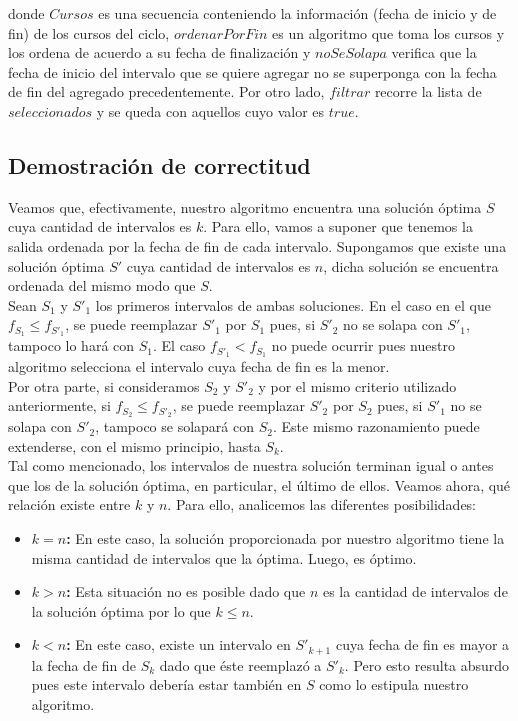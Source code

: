 donde $Cursos$ es una secuencia conteniendo la información (fecha de inicio y de fin) de los cursos del ciclo, $ordenarPorFin$ es un algoritmo que toma los cursos y los ordena de acuerdo a su fecha de finalización y $noSeSolapa$ verifica que la fecha de inicio del intervalo que se quiere agregar no se superponga con la fecha de fin del agregado precedentemente. Por otro lado, $filtrar$ recorre la lista de $seleccionados$ y se queda con aquellos cuyo valor es $true$.

\subsection{Demostración de correctitud}

Veamos que, efectivamente, nuestro algoritmo encuentra una solución óptima $S$ cuya cantidad de intervalos es $k$. Para ello, vamos a suponer que tenemos la salida ordenada por la fecha de fin de cada intervalo. Supongamos que existe una solución óptima $S'$ cuya cantidad de intervalos es $n$, dicha solución se encuentra ordenada del mismo modo que $S$.\\
\newline
Sean $S_{1}$ y $S'_{1}$ los primeros intervalos de ambas soluciones. En el caso en el que $f_{S_{1}} \leq f_{S'_{1}}$, se puede reemplazar $S'_{1}$ por $S_{1}$ pues, si $S'_{2}$ no se solapa con $S'_{1}$, tampoco lo hará con $S_{1}$. El caso $f_{S'_{1}} < f_{S_{1}}$ no puede ocurrir pues nuestro algoritmo selecciona el intervalo cuya fecha de fin es la menor.\\
\newline
Por otra parte, si consideramos $S_{2}$ y $S'_{2}$ y por el mismo criterio utilizado anteriormente, si $f_{S_{2}} \leq f_{S'_{2}}$, se puede reemplazar $S'_{2}$ por $S_{2}$ pues, si $S'_{1}$ no se solapa con $S'_{2}$, tampoco se solapará con $S_{2}$. Este mismo razonamiento puede extenderse, con el mismo principio, hasta $S_{k}$.\\
\newline
Tal como mencionado, los intervalos de nuestra solución terminan igual o antes que los de la solución óptima, en particular, el último de ellos. Veamos ahora, qué relación existe entre $k$ y $n$. Para ello, analicemos las diferentes posibilidades:
\begin{itemize}
\item \textbf{$k = n$:} En este caso, la solución proporcionada por nuestro algoritmo tiene la misma cantidad de intervalos que la óptima. Luego, es óptimo.
\item \textbf{$k > n$:} Esta situación no es posible dado que $n$ es la cantidad de intervalos de la solución óptima por lo que $k \leq n$.
\item \textbf{$k < n$:} En este caso, existe un intervalo en $S'_{k+1}$ cuya fecha de fin es mayor a la fecha de fin de $S_{k}$ dado que éste reemplazó a $S'_{k}$. Pero esto resulta absurdo pues este intervalo debería estar también en $S$ como lo estipula nuestro algoritmo.
\end{itemize}

